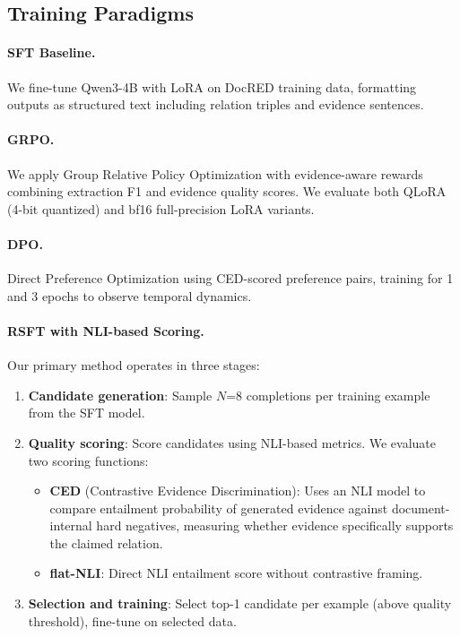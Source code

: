 \documentclass[11pt,a4paper]{article}
\begin{document}
\subsection{Training Paradigms}

\paragraph{SFT Baseline.} We fine-tune Qwen3-4B with LoRA on DocRED training data, formatting outputs as structured text including relation triples and evidence sentences.

\paragraph{GRPO.} We apply Group Relative Policy Optimization with evidence-aware rewards combining extraction F1 and evidence quality scores. We evaluate both QLoRA (4-bit quantized) and bf16 full-precision LoRA variants.

\paragraph{DPO.} Direct Preference Optimization using CED-scored preference pairs, training for 1 and 3 epochs to observe temporal dynamics.

\paragraph{RSFT with NLI-based Scoring.} Our primary method operates in three stages:
\begin{enumerate}
\item \textbf{Candidate generation}: Sample $N$=8 completions per training example from the SFT model.
\item \textbf{Quality scoring}: Score candidates using NLI-based metrics. We evaluate two scoring functions:
\begin{itemize}
\item \textbf{CED} (Contrastive Evidence Discrimination): Uses an NLI model to compare entailment probability of generated evidence against document-internal hard negatives, measuring whether evidence specifically supports the claimed relation.
\item \textbf{flat-NLI}: Direct NLI entailment score without contrastive framing.
\end{itemize}
\item \textbf{Selection and training}: Select top-1 candidate per example (above quality threshold), fine-tune on selected data.
\end{enumerate}
\end{document}

